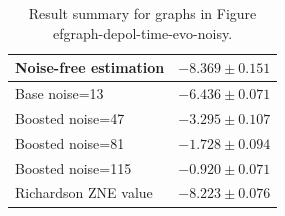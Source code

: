 \begin{table}
\caption{Result summary for graphs in Figure 
ef{graph-depol-time-evo-noisy}.}
\begin{tabular*}{\textwidth}{@{\extracolsep{\fill}}ll@{}}
\toprule

Noise-free estimation & $-8.369 \pm 0.151$ \\
\midrule
Base noise=13 & $-6.436 \pm 0.071$ \\
Boosted noise=47 & $-3.295 \pm 0.107$ \\
Boosted noise=81 & $-1.728 \pm 0.094$ \\
Boosted noise=115 & $-0.920 \pm 0.071$ \\
\midrule
Richardson ZNE value & $-8.223 \pm 0.076$ \\
\bottomrule
\end{tabular*}
\label{table-depol-time-evo-noisy}
\end{table}
